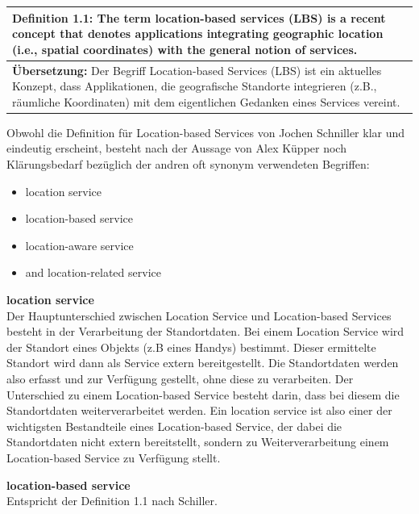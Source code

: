 \begin{table}[h]
	\centering
	\begin{tabular}{|p{16cm}|}\hline
		\textbf{Definition 1.1:} \glqq The term location-based services (LBS) is a recent concept that denotes applications integrating geographic location (i.e., spatial coordinates) with the general notion of services. \grqq \cite[S.1]{Schiller2004}\\ \hline
		\textbf{Übersetzung:} Der Begriff Location-based Services (LBS) ist ein aktuelles Konzept, dass Applikationen, die geografische Standorte integrieren (z.B., räumliche Koordinaten) mit dem eigentlichen Gedanken eines Services vereint. \\ \hline
	\end{tabular}
\end{table}

Obwohl die Definition für Location-based Services von Jochen Schniller klar und eindeutig erscheint, besteht nach der Aussage von Alex Küpper noch Klärungsbedarf bezüglich der andren oft synonym verwendeten Begriffen:
\begin{itemize}
\item location service
\item location-based service
\item location-aware service
\item and location-related service
\end{itemize}



\textbf{location service} \\
Der Hauptunterschied zwischen Location Service und Location-based Services besteht in der Verarbeitung der Standortdaten. Bei einem Location Service wird der Standort eines Objekts (z.B eines Handys) bestimmt. Dieser ermittelte Standort wird dann als Service extern bereitgestellt. Die Standortdaten werden also erfasst und zur Verfügung gestellt, ohne diese zu verarbeiten.
Der Unterschied zu einem Location-based Service besteht darin, dass bei diesem die Standortdaten weiterverarbeitet werden. Ein location service ist also einer der wichtigsten Bestandteile eines Location-based Service, der dabei die Standortdaten nicht extern bereitstellt, sondern zu Weiterverarbeitung einem Location-based Service zu Verfügung stellt.
\cite[S.1-2]{Kuepper2005}

\textbf{location-based service} \\
Entspricht der Definition 1.1 nach Schiller.



